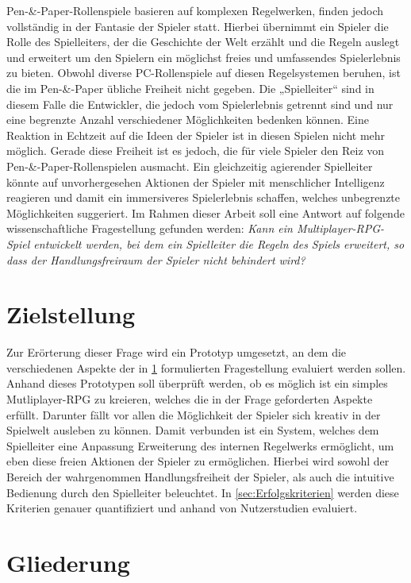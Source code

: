 Pen-\&-Paper-Rollenspiele basieren auf komplexen Regelwerken, finden jedoch vollständig in der Fantasie der Spieler statt. Hierbei übernimmt ein Spieler die Rolle des Spielleiters, der die Geschichte der Welt erzählt und die Regeln auslegt und erweitert um den Spielern ein möglichst freies und umfassendes Spielerlebnis zu bieten. Obwohl diverse PC-Rollenspiele auf diesen Regelsystemen beruhen, ist die im Pen-\&-Paper übliche Freiheit nicht gegeben. Die „Spielleiter“ sind in diesem Falle die Entwickler, die jedoch vom Spielerlebnis getrennt sind und nur eine begrenzte Anzahl verschiedener Möglichkeiten bedenken können. Eine Reaktion in Echtzeit auf die Ideen der Spieler ist in diesen Spielen nicht mehr möglich.\newline
Gerade diese Freiheit ist es jedoch, die für viele Spieler den Reiz von Pen-\&-Paper-Rollenspielen ausmacht. Ein gleichzeitig agierender Spielleiter könnte auf unvorhergesehen Aktionen der Spieler mit menschlicher Intelligenz reagieren und damit ein immersiveres Spielerlebnis schaffen, welches unbegrenzte Möglichkeiten suggeriert. 
Im Rahmen dieser Arbeit soll eine Antwort auf folgende wissenschaftliche Fragestellung gefunden werden:\newline
\emph{Kann ein Multiplayer-RPG-Spiel entwickelt werden, bei dem ein Spielleiter die Regeln des Spiels erweitert, so dass der Handlungsfreiraum der Spieler nicht behindert wird?}

\section{Zielstellung}
\label{sec:Zielstellung}

Zur Erörterung dieser Frage wird ein Prototyp umgesetzt, an dem die verschiedenen Aspekte der in \ref{sec:Zielstellung} formulierten Fragestellung evaluiert werden sollen. Anhand dieses Prototypen soll überprüft werden, ob es möglich ist ein simples Mutliplayer-RPG zu kreieren, welches die in der Frage geforderten Aspekte erfüllt. Darunter fällt vor allen die Möglichkeit der Spieler sich kreativ in der Spielwelt ausleben zu können. Damit verbunden ist ein System, welches dem Spielleiter eine Anpassung \/ Erweiterung des internen Regelwerks ermöglicht, um eben diese freien Aktionen der Spieler zu ermöglichen. Hierbei wird sowohl der Bereich der wahrgenommen Handlungsfreiheit der Spieler, als auch die intuitive Bedienung durch den Spielleiter beleuchtet. In \ref{sec:Erfolgskriterien} werden diese Kriterien genauer quantifiziert und anhand von Nutzerstudien evaluiert. 

\section{Gliederung}
\label{sec:Gliederung}

